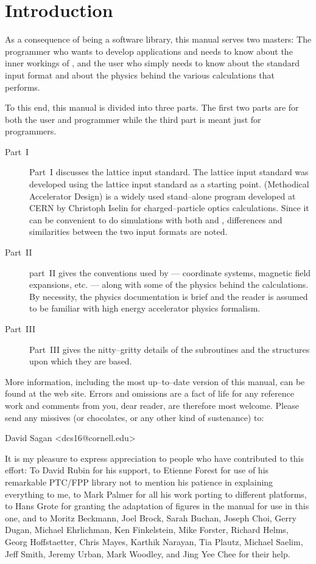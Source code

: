 \section*{Introduction}

As a consequence of \bmad being a software library, this manual serves
two masters: The programmer who wants to develop applications and
needs to know about the inner workings of \bmad, and the user who
simply needs to know about the \bmad standard input format and about
the physics behind the various calculations that \bmad performs.

To this end, this manual is divided into three parts. The first two
parts are for both the user and programmer while the third part is
meant just for programmers. 
  \begin{description}
  \item[Part~I] \Newline
Part~I discusses the \bmad lattice input standard.  The \bmad lattice
input standard was developed using the \mad lattice input standard as
a starting point\cite{b:maduser,b:madphysics}. \mad (Methodical
Accelerator Design) is a widely used stand--alone program developed at
CERN by Christoph Iselin for charged--particle optics
calculations. Since it can be convenient to do simulations with both
\mad and \bmad, differences and similarities between the two input
formats are noted.
  \item[Part~II] \Newline
part~II gives the conventions used by
\bmad --- coordinate systems, magnetic field expansions, etc. ---
along with some of the physics behind the calculations. By necessity,
the physics documentation is brief and the reader is assumed to be familiar
with high energy accelerator physics formalism. 
  \item[Part~III] \Newline
Part~III gives the nitty--gritty details of the \bmad
subroutines and the structures upon which they are based.
\end{description}

More information, including the most up--to--date version of this
manual, can be found at the \bmad web site\cite{b:bmad.web}.
Errors and omissions are a fact of life for any reference work and
comments from you, dear reader, are therefore most welcome. Please
send any missives (or chocolates, or any other kind of sustenance) to:
\begin{example}
  David Sagan <dcs16@cornell.edu>
\end{example}

It is my pleasure to express appreciation to people who have
contributed to this effort: To David Rubin for his support, to Etienne
Forest for use of his remarkable PTC/FPP library not to mention his
patience in explaining everything to me, to Mark Palmer for all his
work porting \bmad to different platforms, to Hans Grote for granting
the adaptation of figures in the \mad manual for use in this one, and
to Moritz Beckmann, Joel Brock, Sarah Buchan, Joseph Choi, Gerry
Dugan, Michael Ehrlichman, Ken Finkelstein, Mike Forster, Richard
Helms, Georg Hoffstaetter, Chris Mayes, Karthik Narayan, Tia Plautz,
Michael Saelim, Jeff Smith, Jeremy Urban, Mark Woodley, and Jing Yee
Chee for their help.

